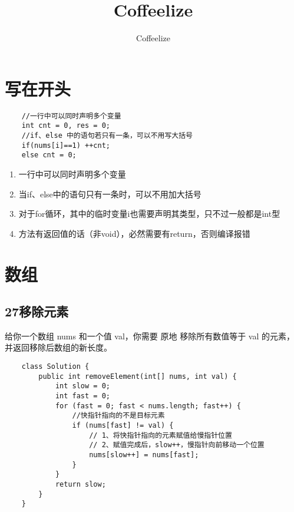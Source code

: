\documentclass{ctexart}
\begin{document}
\title{Coffeelize}
\author{Coffeelize}


\section{写在开头}

\begin{lstlisting}
	//一行中可以同时声明多个变量
	int cnt = 0, res = 0;
	//if、else 中的语句若只有一条，可以不用写大括号
	if(nums[i]==1) ++cnt;
	else cnt = 0;
\end{lstlisting}

\begin{enumerate}
	\item 一行中可以同时声明多个变量
	\item 当if、else中的语句只有一条时，可以不用加大括号
	\item 对于for循环，其中的临时变量i也需要声明其类型，只不过一般都是int型
	\item 方法有返回值的话（非void），必然需要有return，否则编译报错
\end{enumerate}



\section{数组}

\subsection{27移除元素}

给你一个数组 nums 和一个值 val，你需要 原地 移除所有数值等于 val 的元素，并返回移除后数组的新长度。

\begin{lstlisting}
	class Solution {
		public int removeElement(int[] nums, int val) {
			int slow = 0;
			int fast = 0;
			for (fast = 0; fast < nums.length; fast++) {
				//快指针指向的不是目标元素
				if (nums[fast] != val) {
					// 1、将快指针指向的元素赋值给慢指针位置
					// 2、赋值完成后，slow++，慢指针向前移动一个位置
					nums[slow++] = nums[fast];
				}
			}
			return slow;
		}
	}
\end{lstlisting}




\end{document}
